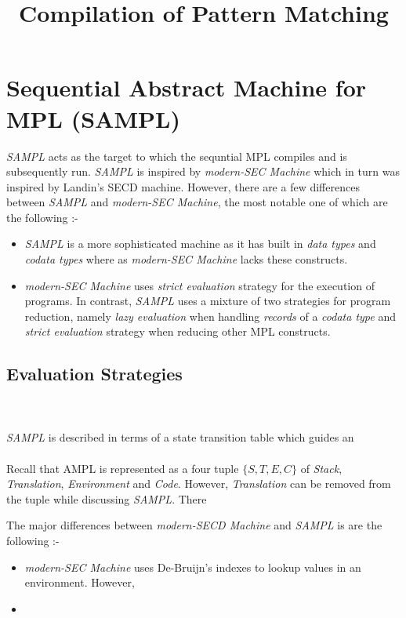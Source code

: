 \documentclass[11pt]{article}
\title{Compilation of Pattern Matching}
\begin{document}
\maketitle
\section {Sequential Abstract Machine for MPL (SAMPL)}
{\em SAMPL} acts as the target to which the sequntial MPL compiles and is subsequently run. {\em SAMPL} is inspired by {\em modern-SEC Machine}  which in turn was inspired by Landin's SECD machine. However, there are a few differences between {\em SAMPL} and {\em modern-SEC Machine}, the most notable one of which are the following :-
 \begin{itemize}
   \item {\em SAMPL} is a more sophisticated machine as it has built in {\em data types} and {\em codata types} where as {\em modern-SEC Machine} lacks these constructs.
   \item {\em modern-SEC Machine} uses {\em strict evaluation} strategy for the execution of programs. In contrast, {\em SAMPL} uses a mixture of two strategies for program reduction, namely {\em lazy evaluation} when handling {\em records} of a {\em codata type} and {\em strict evaluation} strategy when reducing other MPL constructs.
 \end{itemize}

 \subsection {Evaluation Strategies}


~~\\~~\\ 
{\em SAMPL} is described in terms of a state transition table which guides an  
~~\\~~\\ 
Recall that AMPL is represented as a four tuple $\{S,T,E,C\}$ of {\em Stack}, {\em Translation}, {\em Environment} and {\em Code}. However, {\em Translation} can be removed from the tuple while discussing {\em SAMPL}. There 



The major differences between {\em modern-SECD Machine} and {\em SAMPL} is are the following :-

\begin{itemize}
   \item {\em modern-SEC Machine} uses De-Bruijn's indexes to lookup values in an environment. However, 
   \item 
 \end{itemize} 
\end{document}
